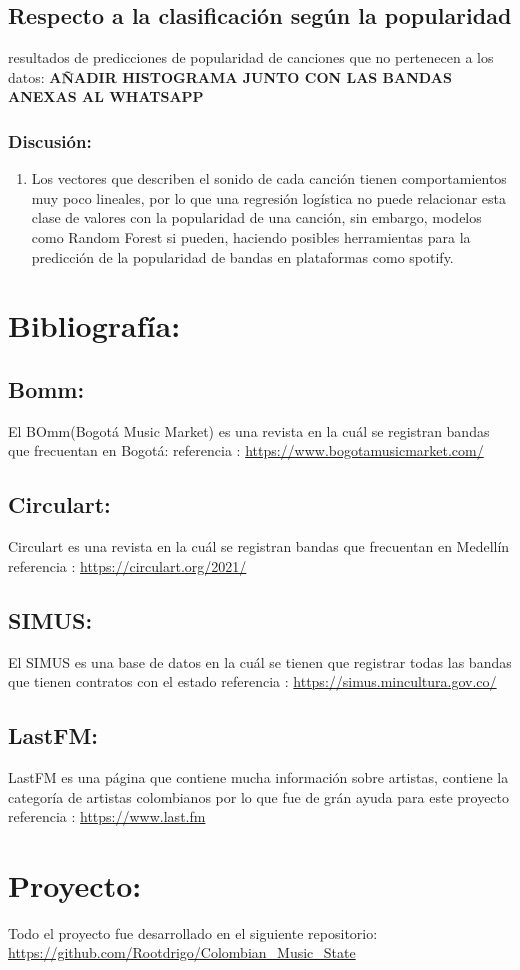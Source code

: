 \documentclass[11pt]{article}
\begin{document}
\subsection{Respecto a la clasificación según la popularidad}
\label{sec:org0b152a2}
resultados de predicciones de popularidad de canciones que no pertenecen a los datos:
\textbf{AÑADIR HISTOGRAMA JUNTO CON LAS BANDAS ANEXAS AL WHATSAPP}
\subsubsection{Discusión:}
\label{sec:orgc2a9329}
\begin{enumerate}
\item Los vectores que describen el sonido de cada canción tienen comportamientos muy poco lineales, por lo que una regresión logística no puede relacionar esta clase de valores con la popularidad de una canción, sin embargo, modelos como Random Forest si pueden, haciendo posibles herramientas para la predicción de la popularidad de bandas en plataformas como spotify.
\end{enumerate}


\section{Bibliografía:}
\label{sec:org9b3de95}
\subsection{Bomm:}
\label{sec:org2bdc36b}
El BOmm(Bogotá Music Market) es una revista en la cuál se registran bandas que frecuentan en Bogotá:
referencia : \url{https://www.bogotamusicmarket.com/}
\subsection{Circulart:}
\label{sec:org0cb7d32}
Circulart es una revista en la cuál se registran bandas que frecuentan en Medellín
referencia :  \url{https://circulart.org/2021/}
\subsection{SIMUS:}
\label{sec:org571f4ce}
El SIMUS es una base de datos en la cuál se tienen que registrar todas las bandas que tienen contratos con el estado
referencia : \url{https://simus.mincultura.gov.co/}
\subsection{LastFM:}
\label{sec:org34398b5}
LastFM es una página que contiene mucha información sobre artistas, contiene la categoría de artistas colombianos por lo que fue de grán ayuda para este proyecto
referencia : \url{https://www.last.fm}

\section{Proyecto:}
\label{sec:org5db57f3}
Todo el proyecto fue desarrollado en el siguiente repositorio:
\url{https://github.com/Rootdrigo/Colombian\_Music\_State}
\end{document}
